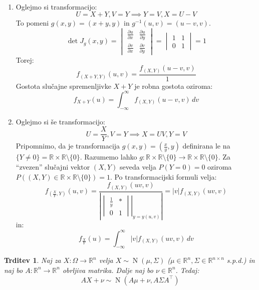 \documentclass[12pt]{book}
\theoremstyle{definition}
\theoremstyle{plain}
\theoremstyle{plain}
\newtheorem{trditev}{Trditev}
\theoremstyle{plain}
\theoremstyle{plain}
\theoremstyle{remark}
\begin{document}
\begin{zgled}
    ~

    \begin{enumerate}
        \item Oglejmo si transformacijo: 
        $$
        U=X+Y, V=Y \implies Y=V, X=U-V
        $$
        To pomeni $g(x, y)=(x+y, y)$ in $g^{-1}(u, v)=(u-v, v)$. 
        $$
        \det J_g (x,y) = \begin{vmatrix}
            \frac{\partial u}{\partial x} & \frac{\partial u}{\partial y} \\
            \frac{\partial v}{\partial x} & \frac{\partial v}{\partial y}
            \end{vmatrix} = \begin{vmatrix}1 & 1 \\ 0 & 1\end{vmatrix} = 1
        $$
        Torej: 
        $$
        f_{(X+Y, Y)}(u, v)=\frac{f_{(X, Y)}(u-v, v)}{1}
        $$
        Gostota slučajne spremenljivke $X+Y$ je robna gostota oziroma: 
        $$
        f_{X+Y}(u)=\int_{-\infty}^{\infty} f_{(X, Y)}(u-v, v) \, d v
        $$
        \item Oglejmo si še transformacijo: 
        $$
        U=\frac{X}{Y}, V=Y \implies X=U V, Y=V
        $$  
        Pripomnimo, da je transformacija $g(x, y)=\left(\frac{x}{y}, y\right)$ definirana le na $\{Y \neq 0\}=\mathbb{R} \times \mathbb{R} \setminus \{0\}$. Razumemo lahko $g: \mathbb{R} \times \mathbb{R} \setminus\{0\} \to \mathbb{R} \times \mathbb{R} \setminus\{0\}$. Za “zvezen” slučajni vektor $(X,Y)$ seveda velja $P(Y=0)=0$ oziroma $P((X, Y) \in \mathbb{R} \times \mathbb{R} \setminus\{0\})=1$. Po transformacijski formuli velja: 
        $$
        f_{\left(\frac{X}{Y}, Y\right)}(u, v) = \frac{f_{(X, Y)}(u v, v)}{\left\lvert\left.\begin{vmatrix}\frac{1}{y} & * \\ 0 & 1\end{vmatrix}\right|_{y = y(u,v)}\right\rvert} =|v| f_{(X, Y)}(u v, v)
        $$  
        in:
        $$
        f_{\frac{X}{Y}}(u)=\int_{-\infty}^{\infty}|v| f_{(X, Y)}(u v, v) \, d v
        $$
    \end{enumerate}
\end{zgled}

\begin{trditev}
    Naj za $X: \Omega \rightarrow \mathbb{R}^n$ velja $X \sim \operatorname{N}(\mu, \Sigma)$ ($\mu \in \mathbb{R}^n, \Sigma \in \mathbb{R}^{n \times n}$ s.p.d.) in naj bo $A: \mathbb{R}^n \to \mathbb{R}^n$ obrljiva matrika. Dalje naj bo $\nu \in \mathbb{R}^n$. Tedaj: 
    $$
    A X+\nu \sim \operatorname{N}\left(A \mu+\nu, A \Sigma A^{\top}\right)
    $$
\end{trditev}
\end{document}
